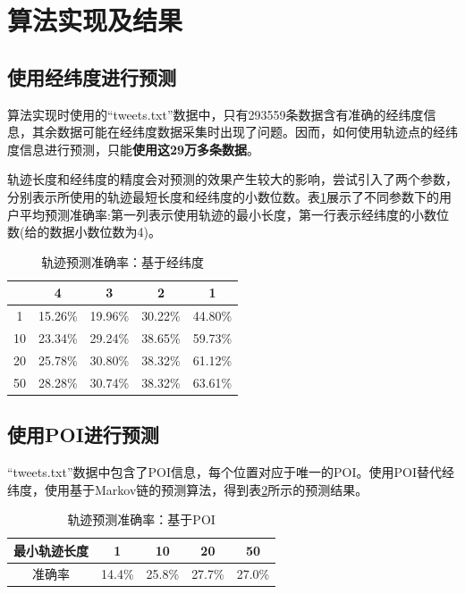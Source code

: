 \documentclass[11pt,twocolumn]{article}
\begin{document}
\section{算法实现及结果}
\subsection{使用经纬度进行预测}
算法实现时使用的“tweets.txt”数据中，只有293559条数据含有准确的经纬度信息，其余数据可能在经纬度数据采集时出现了问题。因而，如何使用轨迹点的经纬度信息进行预测，只能\textbf{使用这29万多条数据}。

轨迹长度和经纬度的精度会对预测的效果产生较大的影响，尝试引入了两个参数，分别表示所使用的轨迹最短长度和经纬度的小数位数。表\ref{rlatlon}展示了不同参数下的用户平均预测准确率:第一列表示使用轨迹的最小长度，第一行表示经纬度的小数位数(给的数据小数位数为4)。

\begin{table}[!htbp]
  \centering  
  \begin{tabular}{c|c|c|c|c} 
  \hline
	    & 4 & 3 & 2 & 1 \\ \hline
	1	&	15.26\%	&	19.96\%	&	30.22\%	&	44.80\% \\
	10	&	23.34\%	&	29.24\%	&	38.65\%	&	59.73\% \\
	20	&	25.78\%	&	30.80\%	&	38.32\%	&	61.12\% \\
	50	&	28.28\%	&	30.74\%	&	38.32\%	&	63.61\% \\
  	\hline
  \end{tabular}
\caption{轨迹预测准确率：基于经纬度}
\label{rlatlon}
\end{table}

\subsection{使用POI进行预测}
“tweets.txt”数据中包含了POI信息，每个位置对应于唯一的POI。使用POI替代经纬度，使用基于Markov链的预测算法，得到表\ref{rPOI}所示的预测结果。

\begin{table}[!htbp]
  \centering  
  \begin{tabular}{c|c|c|c|c} 
	\hline
	最小轨迹长度	& 1	& 10 & 	20	& 50 \\ \hline
	准确率	& 14.4\% & 25.8\%	& 27.7\% & 27.0\% \\
	\hline
  \end{tabular}
\caption{轨迹预测准确率：基于POI}
\label{rPOI}
\end{table}
\end{document}
